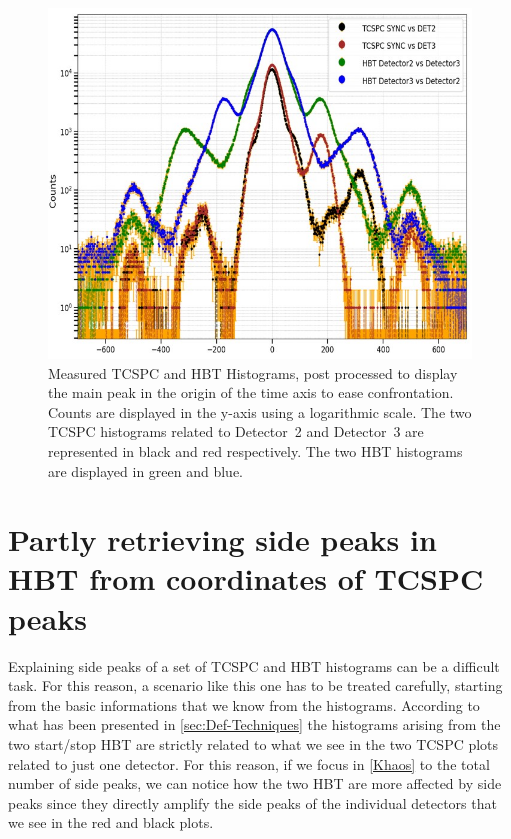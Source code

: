 \begin{figure}[hbtp]
\centering
\includegraphics[width=1\textwidth]{Khaos.jpg}
\caption{Measured TCSPC and HBT Histograms, post processed to display the main peak in the origin of the time axis to ease confrontation. Counts are displayed in the y-axis using a logarithmic scale. The two TCSPC histograms related to Detector~2 and Detector~3 are represented in black and red respectively. The two HBT histograms are displayed in green and blue.}
\label{Khaos}
\end{figure}

\section{Partly retrieving side peaks in HBT from coordinates of TCSPC peaks}
\label{cpp:Reconstructsides}
Explaining side peaks of a set of TCSPC and HBT histograms can be a difficult task. 
For this reason, a scenario like this one has to be treated carefully, starting from the basic informations that we know from the histograms.
According to what has been presented in \autoref{sec:Def-Techniques} the histograms arising from the two start/stop HBT  are strictly related to what we see in the two TCSPC plots related to just one detector.
For this reason, if we focus in \autoref{Khaos} to the total number of side peaks, we can notice how the two HBT are more affected by side peaks since they directly amplify the side peaks of the individual detectors that we see in the red and black plots. %

